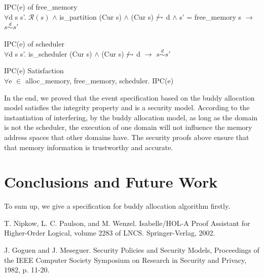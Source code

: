 \documentclass[runningheads]{llncs}
\makeatletter
\newcommand{\equidom}[3]{{#1}\stackrel{#2}{\sim}{#3}}
\newcommand{\superimpose}[2]
	{{\ooalign{$#1\@firstoftwo#2$\cr\hfil$#1\@secondoftwo#2$\hfil\cr}}}
\newcommand{\ninterf}{\mathrel{\mathpalette\superimpose{{\slash}{\leadsto}}}}
\makeatother
\begin{document}
\begin{lemma} {IPC(e) of free\_memory} \\
$\forall$d s s'. $\mathcal{R}(s)$ $\wedge$ is\_partition (Cur s) $\wedge$ (Cur s) $\ninterf$ d $\wedge$ s' = free\_memory s $\longrightarrow$ $\equidom{s}{d}{s'}$
\end{lemma}

\begin{lemma} {IPC(e) of scheduler} \\
$\forall$d s s'. is\_scheduler (Cur s) $\wedge$ (Cur s) $\ninterf$ d $\longrightarrow$ $\equidom{s}{d}{s'}$
\end{lemma}

\begin{theorem} {IPC(e) Satisfaction} \\
$\forall$e $\in$ {alloc\_memory, free\_memory, scheduler}. IPC(e)
\end{theorem}

In the end, we proved that the event specification based on the buddy allocation model satisfies the integrity property and is a security model. According to the instantiation of interfering, by the buddy allocation model, as long as the domain is not the scheduler, the execution of one domain will not influence the memory address spaces that other domains have. The security proofs above ensure that that memory information is trustworthy and accurate.

\section{Conclusions and Future Work}
To sum up, we give a specification for buddy allocation algorithm firstly. 

\begin{thebibliography}{8}
T. Nipkow, L. C. Paulson, and M. Wenzel. Isabelle/HOL-A Proof Assistant for Higher-Order Logical, volume 2283 of LNCS. Springer-Verlag, 2002.

J. Goguen and J. Meseguer. Security Policies and Security Models, Proceedings of the IEEE Computer Society Symposium on Research in Security and Privacy, 1982, p. 11-20.


\end{thebibliography}
\end{document}
